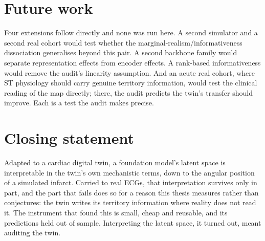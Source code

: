 \section{Future work}
\label{sec:conc-future}

Four extensions follow directly and none was run here. A second simulator and a second real cohort would test whether the marginal-realism/informativeness dissociation generalises beyond this pair. A second backbone family would separate representation effects from encoder effects. A rank-based informativeness would remove the audit's linearity assumption. And an acute real cohort, where ST physiology should carry genuine territory information, would test the clinical reading of the map directly; there, the audit predicts the twin's transfer should improve. Each is a test the audit makes precise.

\section{Closing statement}
\label{sec:conc-close}

Adapted to a cardiac digital twin, a foundation model's latent space is interpretable in the twin's own mechanistic terms, down to the angular position of a simulated infarct. Carried to real ECGs, that interpretation survives only in part, and the part that fails does so for a reason this thesis measures rather than conjectures: the twin writes its territory information where reality does not read it. The instrument that found this is small, cheap and reusable, and its predictions held out of sample. Interpreting the latent space, it turned out, meant auditing the twin.
